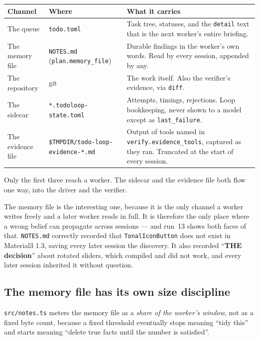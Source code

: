 \documentclass[11pt,a4paper]{article}
\newcommand{\file}[1]{\texttt{#1}}
\newcommand{\key}[1]{\texttt{#1}}
\begin{document}
\begin{longtable}{@{}p{}p{}p{}@{}}
\toprule
\textbf{Channel} & \textbf{Where} & \textbf{What it carries} \\
\midrule
\endhead
The queue & \file{todo.toml} & Task tree, statuses, and the \key{detail} text
that is the next worker's entire briefing. \\
\addlinespace
The memory file & \file{NOTES.md} (\key{plan.memory\_file}) & Durable findings
in the worker's own words. Read by every session, appended by any. \\
\addlinespace
The repository & git & The work itself. Also the verifier's evidence, via
\texttt{diff}. \\
\addlinespace
The sidecar & \file{*.todoloop-state.toml} & Attempts, timings, rejections.
Loop bookkeeping, never shown to a model except as \key{last\_failure}. \\
\addlinespace
The evidence file & \file{\$TMPDIR/todo-loop-evidence-*.md} & Output of tools
named in \key{verify.evidence\_tools}, captured as they ran. Truncated at the
start of every session. \\
\bottomrule
\end{longtable}

Only the first three reach a worker. The sidecar and the evidence file both
flow one way, into the driver and the verifier.

The memory file is the interesting one, because it is the only channel a worker
writes freely and a later worker reads in full. It is therefore the only place
where a wrong belief can propagate across sessions --- and run~13 shows both
faces of that. \file{NOTES.md} correctly recorded that \texttt{TonalIconButton}
does not exist in Material3 1.3, saving every later session the discovery. It
also recorded ``\textbf{THE decision}'' about rotated sliders, which compiled
and did not work, and every later session inherited it without question.

\subsection{The memory file has its own size discipline}

\file{src/notes.ts} meters the memory file as a \emph{share of the worker's
window}, not as a fixed byte count, because a fixed threshold eventually stops
meaning ``tidy this'' and starts meaning ``delete true facts until the number
is satisfied''.
\end{document}
